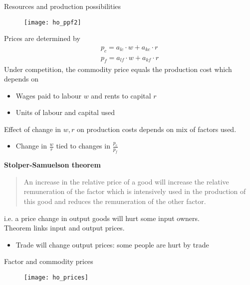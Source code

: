 \documentclass{beamer}
\begin{document}
\begin{frame}{Resources and production possibilities}
  \begin{figure}
    \texttt{[image: ho\_ppf2]}
  \end{figure}
\end{frame}


\begin{frame}
  Prices are determined by
  \begin{align*}
    p_c = a_{lc} \cdot w + a_{kc} \cdot r\\
    p_f = a_{lf} \cdot w + a_{kf} \cdot r
  \end{align*}
  \medskip
  Under competition, the commodity price equals the production cost which depends on
  \begin{itemize}
    \item Wages paid to labour $w$ and rents to capital $r$
    \item Units of labour and capital used
  \end{itemize}
  \medskip
  Effect of change in $w,r$ on production costs depends on mix of factors used.
  \begin{itemize}
    \item Change in $\frac{w}{r}$ tied to changes in $\frac{p_c}{p_f}$
  \end{itemize}  
\end{frame}

\begin{frame}
  \textbf{Stolper-Samuelson theorem}
  \begin{quote}
   An increase in the relative price of a good will increase the relative remuneration of the factor which is intensively used in the production of this good and reduces the remuneration of the other factor. 
  \end{quote}
  \medskip
  i.e. a price change in output goods will hurt some input owners.\\
  Theorem links input and output prices.
  \begin{itemize}
      \item Trade will change output prices: some people are hurt by trade
  \end{itemize}  
\end{frame}

\begin{frame}{Factor and commodity prices}
  \begin{figure}
    \texttt{[image: ho\_prices]}
  \end{figure}
\end{frame}
\end{document}

